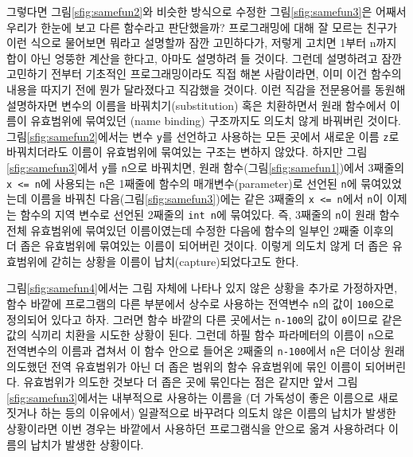 그렇다면 그림\;\ref{sfig:samefun2}와 비슷한 방식으로 수정한 
그림\;\ref{sfig:samefun3}은 어째서 우리가 한눈에 보고 다른 함수라고 판단했을까?
프로그래밍에 대해 잘 모르는 친구가 이런 식으로 물어보면 뭐라고 설명할까
잠깐 고민하다가, 저렇게 고치면 1부터 n까지 합이 아닌 엉뚱한 계산을 한다고,
아마도 설명하려 들 것이다. 그런데 설명하려고 잠깐 고민하기 전부터
기초적인 프로그래밍이라도 직접 해본 사람이라면, 이미 이건 함수의 내용을
따지기 전에 뭔가 달라졌다고 직감했을 것이다. 이런 직감을 전문용어를
동원해 설명하자면 변수의 이름을
%
%
%
%
바꿔치기(substitution) 혹은 치환하면서
원래 함수에서
%
%
이름이 유효범위에 묶여있던 (name binding) 구조까지도 의도치
않게 바꿔버린 것이다. 그림\;\ref{sfig:samefun2}에서는 변수 \texttt{y}를 선언하고
사용하는 모든 곳에서 새로운 이름 \texttt{z}로 바꿔치더라도 이름이 유효범위에
묶여있는 구조는 변하지 않았다. 하지만 그림\;\ref{sfig:samefun3}에서 \texttt{y}를
\texttt{n}으로 바꿔치면, 원래 함수(그림\;\ref{sfig:samefun1})에서 3째줄의
\texttt{x\,<=\,n}에 사용되는 \texttt{n}은 1째줄에 함수의 매개변수(parameter)로
선언된 \texttt{n}에 묶여있었는데 이름을 바꿔친 다음(그림\;\ref{sfig:samefun3})에는
같은 3째줄의 \texttt{x\,<=\,n}에서 \texttt{n}이 이제는 함수의 지역 변수로 선언된
2째줄의 \texttt{int n}에 묶여있다. 즉, 3째줄의 \texttt{n}이 원래 함수 전체
유효범위에 묶여있던 이름이였는데 수정한 다음에 함수의 일부인 2째줄 이후의
더 좁은 유효범위에 묶여있는 이름이 되어버린 것이다. 이렇게 의도치 않게
더 좁은 유효범위에 갇히는 상황을 이름이 납치(capture)되었다고도 한다.

그림\;\ref{sfig:samefun4}에서는 그림 자체에 나타나 있지 않은 상황을 추가로
가정하자면, 함수 바깥에 프로그램의 다른 부분에서 상수로 사용하는 전역변수
\texttt{n}의 값이 \texttt{100}으로 정의되어 있다고 하자. 그러면 함수 바깥의
다른 곳에서는 \texttt{n-100}의 값이 \texttt{0}이므로 같은 값의 식끼리 치환을
시도한 상황이 된다. 그런데 하필 함수 파라메터의 이름이 \texttt{n}으로 전역변수의
이름과 겹쳐서 이 함수 안으로 들어온 2째줄의 \texttt{n-100}에서 \texttt{n}은
더이상 원래 의도했던 전역 유효범위가 아닌 더 좁은 범위의 함수 유효범위에 묶인
이름이 되어버린다. 유효범위가 의도한 것보다 더 좁은 곳에 묶인다는 점은 같지만
앞서 그림\;\ref{sfig:samefun3}에서는 내부적으로 사용하는 이름을 (더 가독성이
좋은 이름으로 새로 짓거나 하는 등의 이유에서) 일괄적으로 바꾸려다 의도치 않은
이름의 납치가 발생한 상황이라면 이번 경우는 바깥에서 사용하던 프로그램식을
안으로 옮겨 사용하려다 이름의 납치가 발생한 상황이다.

